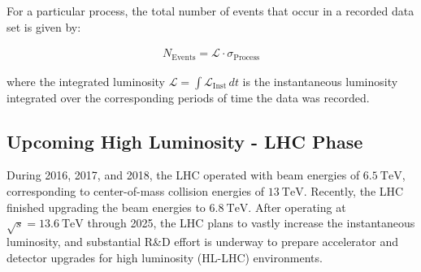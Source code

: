 For a particular process, the total number of events that occur in a recorded data set is given by:
\begin{linenomath*}
\begin{align}
N_{\text {Events}}= \mathcal{L} \cdot \sigma_{\text{Process}}
\end{align}
\end{linenomath*}
where the integrated luminosity $\mathcal{L} = \int \mathcal{L}_{\text{Inst}} \,dt$ is the instantaneous luminosity integrated over the corresponding periods of time the data was recorded.

\subsection{Upcoming High Luminosity - LHC Phase}
During 2016, 2017, and 2018, the LHC operated with beam energies of $\SI{6.5}{\TeV}$, corresponding to center-of-mass collision energies of $\SI{13}{\TeV}$.
Recently, the LHC finished upgrading the beam energies to $\SI{6.8}{\TeV}$.
After operating at $\sqrt{s}=\SI{13.6}{\TeV}$ through 2025, the LHC plans to vastly increase the instantaneous luminosity, and substantial R\&D effort is underway to prepare accelerator and detector upgrades for high luminosity (HL-LHC) environments.

